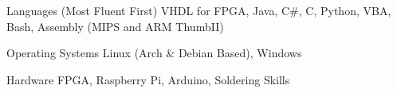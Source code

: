 \begin{cvskills}
	\cvskill
	{Languages (Most Fluent First)}
	{VHDL for FPGA, Java, C\#, C, Python, VBA, Bash, Assembly (MIPS and ARM ThumbII)}

	\cvskill
	{Operating Systems}
	{Linux (Arch \& Debian Based), Windows}

	\cvskill
	{Hardware}
	{FPGA, Raspberry Pi, Arduino, Soldering Skills}
\end{cvskills}
